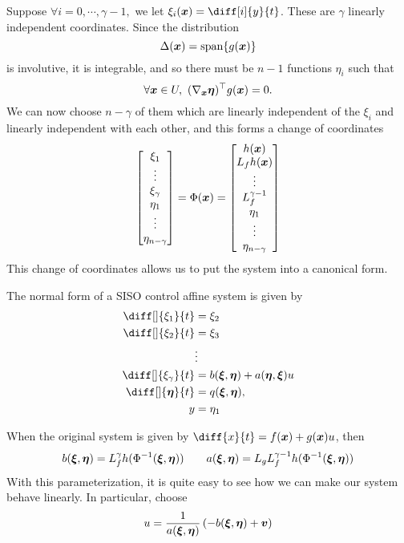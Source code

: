 Suppose $\forall i=0,\cdots,\gamma-1,$ we let $\xi_i(\bs{x}) = \diff[i]{y}{t}$.
These are $\gamma$ linearly independent coordinates. Since the distribution \[
	\Delta(\boldsymbol{x}) = \text{span}\{g(\boldsymbol{x})\}
\]
is involutive, it is integrable, and so there must be $n-1$ functions $\eta_i$
such that \[
	\forall \bs{x}\in U,\ (\nabla_{\bs{x}}\bs{\eta})^\top g(\bs{x}) = 0.
\]
We can now choose $n-\gamma$ of them which are linearly independent of the
$\xi_i$ and linearly independent with each other, and this forms a change of
coordinates \[
	\begin{bmatrix}
		\xi_1\\
		\vdots\\
		\xi_{\gamma}\\
		\eta_1\\
		\vdots\\
		\eta_{n-\gamma}
	\end{bmatrix} = \Phi(\boldsymbol{x}) = \begin{bmatrix}
		h(\boldsymbol{x})\\
		L_fh(\boldsymbol{x})\\
		\vdots\\
		L_f^{\gamma-1}\\
		\eta_1\\
		\vdots\\
		\eta_{n-\gamma}
	\end{bmatrix}
\]
This change of coordinates allows us to put the system into a canonical form.
\begin{definition}
	The normal form of a SISO control affine system is given by \[
		\begin{aligned}
			\diff[]{\xi_1}{t} &= \xi_2\\
			\diff[]{\xi_2}{t} &= \xi_3\\
			&\vdots\\
			\diff[]{\xi_{\gamma}}{t} &= b(\bs{\xi}, \bs{\eta}) + a(\bs{\eta},
			\bs{\xi})u\\
			\diff[]{\bs{\eta}}{t} &= q(\bs{\xi}, \bs{\eta}),\\
			y &= \eta_1
		\end{aligned}
	\]
	\label{defn:normal-form-siso}
\end{definition}
When the original system is given by $\diff{x}{t} = f(\bs{x})+g(\bs{x})u$, then
\[
	b(\boldsymbol{\xi},\boldsymbol{\eta}) = L_f^\gamma h(\Phi^{-1}(\boldsymbol{\xi}, \boldsymbol{\eta})) \qquad
	a(\boldsymbol{\xi}, \boldsymbol{\eta}) = L_gL_f^{\gamma-1} h(\Phi^{-1}(\boldsymbol{\xi}, \boldsymbol{\eta}))
\]
With this parameterization, it is quite easy to see how we can make our system
behave linearly. In particular, choose \[
	u = \frac{1}{a(\boldsymbol{\xi}, \boldsymbol{\eta})}\left(-b(\boldsymbol{\xi}, \boldsymbol{\eta}) +
	\boldsymbol{v}\right)
\]
